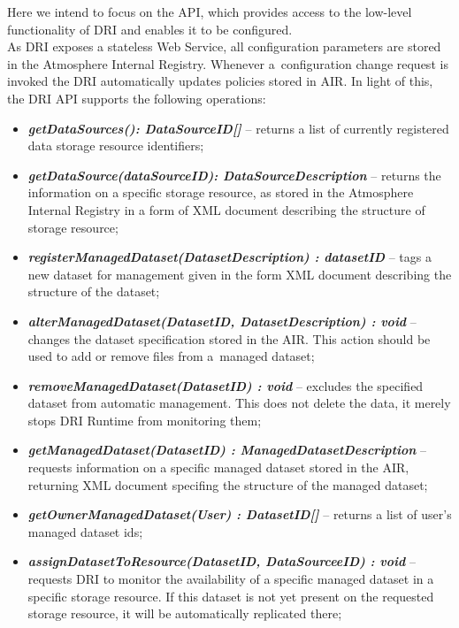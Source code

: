 Here we intend to focus on the API, which provides access to the low-level
functionality of DRI and enables it to be configured.\\

As DRI exposes a stateless Web Service, all configuration parameters are stored
in the Atmosphere Internal Registry. Whenever a~configuration change request
is invoked the DRI automatically updates policies stored in AIR. In light
of this, the DRI API supports the following operations:

\begin{itemize}
	\item \textbf{\textit{getDataSources(): DataSourceID[]}} --
	returns a list of currently registered data storage resource identifiers;
	
	\item \textbf{\textit{getDataSource(dataSourceID):
	DataSourceDescription}} -- returns the information on a specific storage
	resource, as stored in the Atmosphere Internal Registry in a form of XML
	document describing the structure of storage resource;
	
	\item \textbf{\textit{registerManagedDataset(DatasetDescription) :
	datasetID}} -- tags a new dataset for management given in
	the form XML document describing the structure of the dataset;
	
	\item \textbf{\textit{alterManagedDataset(DatasetID, DatasetDescription) :
	void}} -- changes the dataset specification stored in the AIR. This action
	should be used to add or remove files from a~managed dataset;
	
	\item \textbf{\textit{removeManagedDataset(DatasetID) : void}} -- excludes
	the specified dataset from automatic management. This does not delete the
	data, it merely stops DRI Runtime from monitoring them;
	
	\item \textbf{\textit{getManagedDataset(DatasetID) :
	ManagedDatasetDescription}} -- requests information on a specific managed
	dataset stored in the AIR, returning XML document specifing the structure
	of the managed dataset;
	
	\item \textbf{\textit{getOwnerManagedDataset(User) : DatasetID[]}} --
	returns a list of user's managed dataset ids;
	
	\item \textbf{\textit{assignDatasetToResource(DatasetID, 
	DataSourceeID) : void}} -- requests DRI to monitor the availability of
	a specific managed dataset in a specific storage resource. If this dataset
	is not yet present on the requested storage resource, it will be
	automatically replicated there;
	

\end{itemize}

